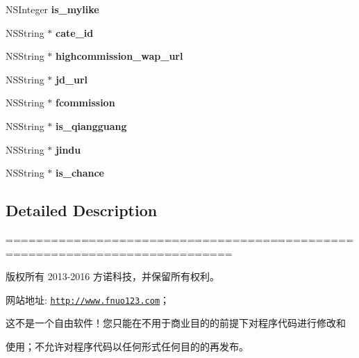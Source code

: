 \begin{DoxyCompactItemize}
N\+S\+Integer {\bfseries is\+\_\+mylike}
\item 
\mbox{\label{interface_x_y_rebates_model_a363eadc523e6a28c2432aa4b66d6abeb}} 
N\+S\+String $\ast$ {\bfseries cate\+\_\+id}
\item 
\mbox{\label{interface_x_y_rebates_model_a6af32bc54b6d49a058d73cf1e523cf54}} 
N\+S\+String $\ast$ {\bfseries highcommission\+\_\+wap\+\_\+url}
\item 
\mbox{\label{interface_x_y_rebates_model_a4cd31ad16563ecd9f7195746dd3f8795}} 
N\+S\+String $\ast$ {\bfseries jd\+\_\+url}
\item 
\mbox{\label{interface_x_y_rebates_model_a23dec6434e543bc12a88064fdf18e758}} 
N\+S\+String $\ast$ {\bfseries fcommission}
\item 
\mbox{\label{interface_x_y_rebates_model_a25a2992907987ad533384abb3262d7ad}} 
N\+S\+String $\ast$ {\bfseries is\+\_\+qiangguang}
\item 
\mbox{\label{interface_x_y_rebates_model_ab3d867bbafdcaf4c7db293dd3918b178}} 
N\+S\+String $\ast$ {\bfseries jindu}
\item 
\mbox{\label{interface_x_y_rebates_model_a2eb844017d82316407ced206297b461b}} 
N\+S\+String $\ast$ {\bfseries is\+\_\+chance}
\end{DoxyCompactItemize}


\subsection{Detailed Description}
============================================================================

版权所有 2013-\/2016 方诺科技，并保留所有权利。

网站地址\+: \href{http://www.fnuo123.com}{\tt http\+://www.\+fnuo123.\+com}； 



这不是一个自由软件！您只能在不用于商业目的的前提下对程序代码进行修改和

使用；不允许对程序代码以任何形式任何目的的再发布。 

